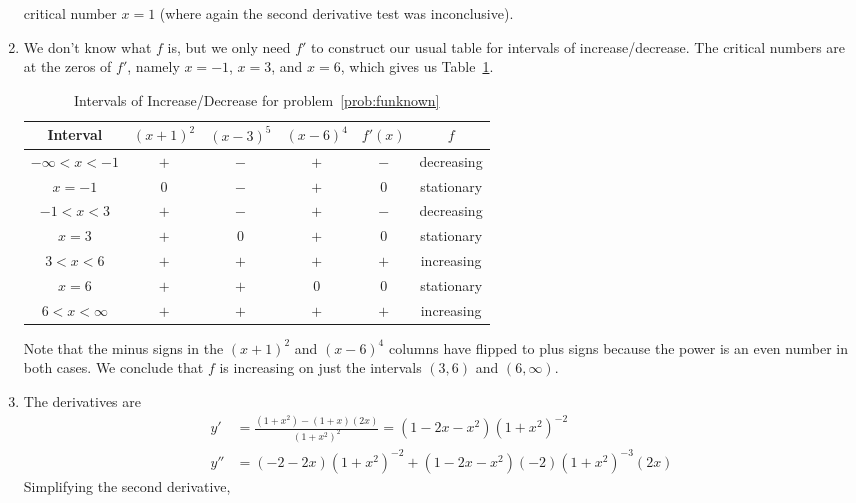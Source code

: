 \documentclass{article}
\begin{document}
\begin{enumerate}
  critical number $x=1$ (where again the second derivative test was
  inconclusive).
\item\label{prob:funknown} %
  We don't know what $f$ is, but we only need $f'$ to construct our
  usual table for intervals of increase/decrease.  The critical
  numbers are at the zeros of $f'$, namely $x=-1$, $x=3$, and $x=6$,
  which gives us Table~\ref{tab:funknown}.
  \begin{table}[htbp]
    \centering
    \begin{tabular}{|c|c|c|c|c|c|}
      \hline
      Interval       & $(x+1)^2$ & $(x-3)^5$ & $(x-6)^4$ & $f'(x)$ & $f$
      \\
      \hline\hline
      $-\infty<x<-1$ & $+$       & $-$       & $+$       & $-$     & decreasing
      \\
      \hline
      $x=-1$         & $0$       & $-$       & $+$       & $0$     & stationary
      \\
      \hline
      $-1<x<3$       & $+$       & $-$       & $+$       & $-$     & decreasing
      \\
      \hline
      $x=3$          & $+$       & $0$       & $+$       & $0$     & stationary
      \\
      \hline
      $3<x<6$        & $+$       & $+$       & $+$       & $+$     & increasing
      \\
      \hline
      $x=6$          & $+$       & $+$       & $0$       & $0$     & stationary
      \\
      \hline
      $6<x<\infty$   & $+$       & $+$       & $+$       & $+$     & increasing
      \\
      \hline
    \end{tabular}
    \caption{Intervals of Increase/Decrease for problem~\ref{prob:funknown}}
    \label{tab:funknown}
  \end{table}
  Note that the minus signs in the $(x+1)^2$ and $(x-6)^4$ columns
  have flipped to plus signs because the power is an even number in
  both cases.  We conclude that $f$ is increasing on just the
  intervals $(3,6)$ and $(6,\infty)$.
\item %
  The derivatives are
  \begin{align*}
    y' &= \frac{(1+x^2)-(1+x)(2x)}{(1+x^2)^2} = (1-2x-x^2)(1+x^2)^{-2} \\
    y'' &= (-2-2x)(1+x^2)^{-2} + (1-2x-x^2)(-2)(1+x^2)^{-3}(2x)
  \end{align*}
  Simplifying the second derivative,
  \begin{align*}

\end{align*}
\end{enumerate}
\end{document}
